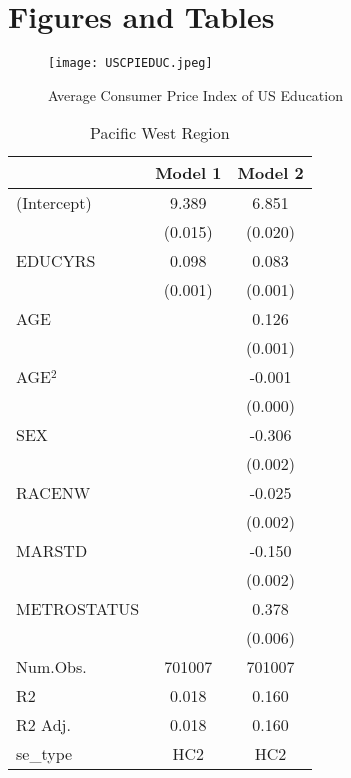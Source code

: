 \documentclass[12pt, English]{article}
\begin{document}
\newpage





\newpage

\section*{Figures and Tables}
\begin{figure}[h!]
\centering
\texttt{[image: USCPIEDUC.jpeg]}
\caption{Average Consumer Price Index of US Education}
\label{fig:Figure 1}
\end{figure}



\newpage

\begin{table}
\centering %
    \caption{Pacific West Region}
    \vspace{7.5mm} %
\begin{tabular}[t]{lcc}
\toprule
  & Model 1 & Model 2\\
\midrule
(Intercept) & 9.389 & 6.851\\
 & (0.015) & (0.020)\\
EDUCYRS & 0.098 & 0.083\\
 & (0.001) & (0.001)\\
AGE &  & 0.126\\
 &  & (0.001)\\
AGE$^2$ &  & -0.001\\
 &  & (0.000)\\
SEX &  & -0.306\\
 &  & \vphantom{2} (0.002)\\
RACENW &  & -0.025\\
 &  & \vphantom{1} (0.002)\\
MARSTD &  & -0.150\\
 &  & (0.002)\\
METROSTATUS &  & 0.378\\
 &  & (0.006)\\
\midrule
Num.Obs. & 701007 & 701007\\
R2 & 0.018 & 0.160\\
R2 Adj. & 0.018 & 0.160\\
se\_type & HC2 & HC2\\
\bottomrule
\end{tabular}
\end{table}
\end{document}
